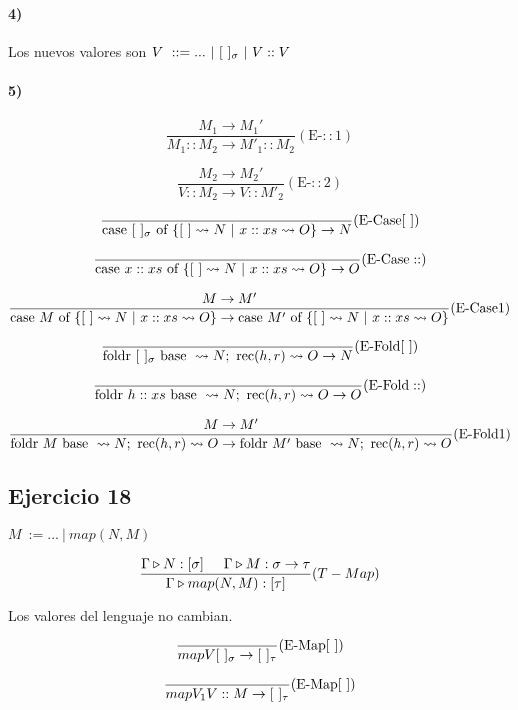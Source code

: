 \documentclass[10pt,a4paper, landscape]{article}
\begin{document}
\paragraph{4)} Los nuevos valores son $V~::= ...~|~[~]_\sigma~|~V::V$
\paragraph{5)}

\begin{multicols}{2}
$$\frac{M_1\to M_1'}{M_1 :: M_2 \to M'_1::M_2}(\text{E-}::\text{1})$$

\vspace*{5mm}
$$\frac{M_2\to M_2'}{V :: M_2 \to V::M'_2}(\text{E-}::\text{2})$$

\vspace*{5mm}
$$\frac{}{\text{case } [~]_\sigma \text{ of } \{[~]\leadsto N~|~x::xs\leadsto O\}\to N}(\text{E-Case}[~])$$

\vspace*{5mm}
$$\frac{}{\text{case } x::xs \text{ of } \{[~]\leadsto N~|~x::xs\leadsto O\}\to O}(\text{E-Case}::)$$
\end{multicols}
\vspace*{5mm}
$$\frac{M\to M'}{\text{case } M \text{ of } \{[~]\leadsto N~|~x::xs\leadsto O\}\to\text{case } M' \text{ of } \{[~]\leadsto N~|~x::xs\leadsto O\}}(\text{E-Case}\text{1})$$

\begin{multicols}{2}
$$\frac{}{\text{foldr } [~]_\sigma \text{ base }\leadsto N;~\text{rec}(h, r)\leadsto O\to N}(\text{E-Fold}[~])$$

\vspace*{5mm}
$$\frac{}{\text{foldr } h::xs \text{ base }\leadsto N;~\text{rec}(h, r)\leadsto O\to O}(\text{E-Fold}::)$$
\end{multicols}

\vspace*{5mm}
$$\frac{M\to M'}{\text{foldr } M \text{ base }\leadsto N;~\text{rec}(h, r)\leadsto O\to\text{foldr } M' \text{ base }\leadsto N;~\text{rec}(h, r)\leadsto O}(\text{E-Fold}\text{1})$$


\subsection{Ejercicio 18}
\begin{multicols}{2}
$M~:= ...~|~map(N,M)$

$$\frac{\Gamma\triangleright N : [\sigma]\hspace*{5mm}\Gamma\triangleright M : \sigma\to\tau}{\Gamma\triangleright map(N,M) : [\tau]}(T-Map)$$
\vfil

Los valores del lenguaje no cambian.

$$\frac{}{map{V}{[~]_\sigma}\to [~]_\tau}(\text{E-Map}[~])$$

$$\frac{}{map{V_1}{V :: M}\to [~]_\tau}(\text{E-Map}[~])$$
\end{multicols}
\end{document}
